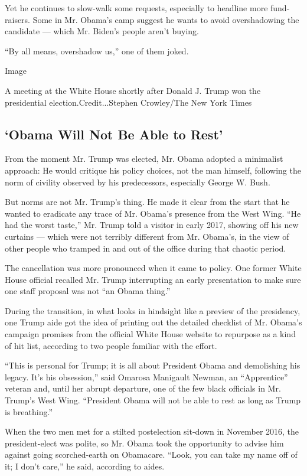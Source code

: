 Yet he continues to slow-walk some requests, especially to headline more
fund-raisers. Some in Mr. Obama's camp suggest he wants to avoid
overshadowing the candidate --- which Mr. Biden's people aren't buying.

``By all means, overshadow us,'' one of them joked.

Image

A meeting at the White House shortly after Donald J. Trump won the
presidential election.Credit...Stephen Crowley/The New York Times

\hypertarget{obama-will-not-be-able-to-rest}{%
\subsection{`Obama Will Not Be Able to
Rest'}\label{obama-will-not-be-able-to-rest}}

From the moment Mr. Trump was elected, Mr. Obama adopted a minimalist
approach: He would critique his policy choices, not the man himself,
following the norm of civility observed by his predecessors, especially
George W. Bush.

But norms are not Mr. Trump's thing. He made it clear from the start
that he wanted to eradicate any trace of Mr. Obama's presence from the
West Wing. ``He had the worst taste,'' Mr. Trump told a visitor in early
2017, showing off his new curtains --- which were not terribly different
from Mr. Obama's, in the view of other people who tramped in and out of
the office during that chaotic period.

The cancellation was more pronounced when it came to policy. One former
White House official recalled Mr. Trump interrupting an early
presentation to make sure one staff proposal was not ``an Obama thing.''

During the transition, in what looks in hindsight like a preview of the
presidency, one Trump aide got the idea of printing out the detailed
checklist of Mr. Obama's campaign promises from the official White House
website to repurpose as a kind of hit list, according to two people
familiar with the effort.

``This is personal for Trump; it is all about President Obama and
demolishing his legacy. It's his obsession,'' said Omarosa Manigault
Newman, an ``Apprentice'' veteran and, until her abrupt departure, one
of the few black officials in Mr. Trump's West Wing. ``President Obama
will not be able to rest as long as Trump is breathing.''

When the two men met for a stilted postelection sit-down in November
2016, the president-elect was polite, so Mr. Obama took the opportunity
to advise him against going scorched-earth on Obamacare. ``Look, you can
take my name off of it; I don't care,'' he said, according to aides.

